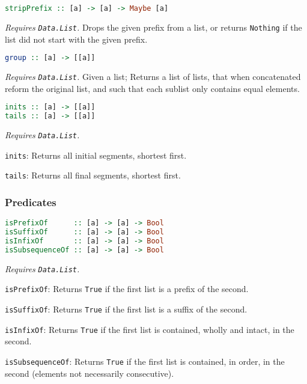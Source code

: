\documentclass[twocolumn,english]{article}
\begin{document}
\begin{lstlisting}[language=Haskell,frame=single]
stripPrefix :: [a] -> [a] -> Maybe [a]
\end{lstlisting}


\emph{Requires }\texttt{\emph{Data.List}}\emph{. }Drops the given
prefix from a list, or returns \texttt{Nothing} if the list did not
start with the given prefix.

\begin{lstlisting}[language=Haskell,frame=single]
group :: [a] -> [[a]]
\end{lstlisting}


\emph{Requires }\texttt{\emph{Data.List}}\emph{. }Given a list; Returns
a list of lists, that when concatenated reform the original list,
and such that each sublist only contains equal elements.

\begin{lstlisting}[language=Haskell,frame=single]
inits :: [a] -> [[a]]
tails :: [a] -> [[a]]
\end{lstlisting}


\emph{Requires }\texttt{\emph{Data.List}}\emph{.}

\texttt{inits}: Returns all initial segments, shortest first.

\texttt{tails}: Returns all final segments, shortest first.


\subsubsection{Predicates}

\begin{lstlisting}[language=Haskell,frame=single]
isPrefixOf      :: [a] -> [a] -> Bool
isSuffixOf      :: [a] -> [a] -> Bool
isInfixOf       :: [a] -> [a] -> Bool
isSubsequenceOf :: [a] -> [a] -> Bool
\end{lstlisting}


\emph{Requires }\texttt{\emph{Data.List}}\emph{.}

\texttt{isPrefixOf}: Returns \texttt{True} if the first list is a
prefix of the second.

\texttt{isSuffixOf}: Returns \texttt{True} if the first list is a
suffix of the second.

\texttt{isInfixOf}: Returns \texttt{True} if the first list is contained,
wholly and intact, in the second.

\texttt{isSubsequenceOf}: Returns \texttt{True} if the first list
is contained, in order, in the second (elements not necessarily consecutive).
\end{document}
